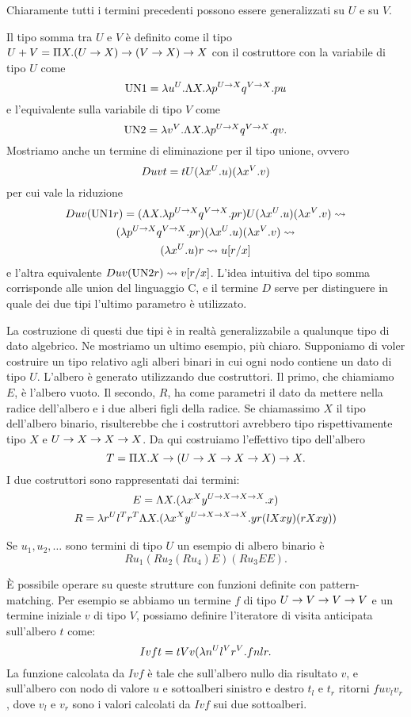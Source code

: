 \documentclass[]{marticle}
\begin{document}
Chiaramente tutti i termini precedenti possono essere generalizzati su $U$ e su
$V$.

Il tipo somma tra $U$ e $V$ \`e definito come il tipo $U+V = \Pi X. (U\rightarrow X)
\rightarrow (V\rightarrow X) \rightarrow X$ con il costruttore con la variabile di tipo $U$ come 
\[
    \text{UN1} = \lambda u^U. \Lambda X. \lambda p^{U\rightarrow X} q^{V\rightarrow X}. pu
\]
e l'equivalente sulla variabile di tipo $V$ come 
\[
    \text{UN2} = \lambda v^V. \Lambda X. \lambda p^{U\rightarrow X} q^{V\rightarrow X}. qv.
\]
Mostriamo anche un termine di eliminazione per il tipo unione, ovvero
\[
    D uvt = tU (\lambda x^U.u)(\lambda x^V.v)
\]
per cui vale la riduzione
\begin{gather*}
    Duv(\text{UN1}r) = (\Lambda X. \lambda p^{U\rightarrow X}q^{V\rightarrow X}. pr) U (\lambda x^U.u)(\lambda
    x^V.v) \rightsquigarrow \\
    (\lambda p^{U\rightarrow X}q^{V\rightarrow X}. pr)(\lambda x^U.u)(\lambda x^V.v) \rightsquigarrow \\
    (\lambda x^U.u) r \rightsquigarrow u[r/x]
\end{gather*}
e l'altra equivalente $Duv(\text{UN2}r) \rightsquigarrow v[r/x]$.
L'idea intuitiva del tipo somma corrisponde alle union del linguaggio C, e il
termine $D$ serve per distinguere in quale dei due tipi l'ultimo parametro \`e
utilizzato.

La costruzione di questi due tipi \`e in realt\`a generalizzabile a qualunque
tipo di dato algebrico. Ne mostriamo un ultimo esempio, pi\`u chiaro. Supponiamo
di voler costruire un tipo relativo agli alberi binari in cui ogni nodo contiene
un dato di tipo $U$. L'albero \`e generato utilizzando due costruttori. Il
primo, che chiamiamo $E$, \`e l'albero vuoto. Il secondo, $R$, ha come parametri
il dato da mettere nella radice dell'albero e i due alberi figli della radice.
Se chiamassimo $X$ il tipo dell'albero binario, risulterebbe che i costruttori
avrebbero tipo rispettivamente tipo $X$ e $U \rightarrow X\rightarrow X \rightarrow X$. Da qui
costruiamo l'effettivo tipo dell'albero
\[
    T = \Pi X. X \rightarrow (U \rightarrow X \rightarrow X \rightarrow X) \rightarrow X.
\]
I due costruttori sono rappresentati dai termini:
\begin{gather*}
    E = \Lambda X. (\lambda x^X y^{U \rightarrow X \rightarrow X \rightarrow X}.x) \\
    R = \lambda r^U l^T r^T \Lambda X. (\lambda x^X y^{U \rightarrow X \rightarrow X \rightarrow X}.yr(lXxy)(rXxy))
\end{gather*}

Se $u_1, u_2,\dots$ sono termini di tipo $U$ un esempio di albero binario \`e 
\[
    Ru_1(Ru_2(Ru_4)E)(Ru_3EE).
\]

\`E possibile operare su queste strutture con funzioni definite con
pattern-matching. Per esempio se abbiamo un termine $f$ di tipo $U\rightarrow V \rightarrow V\rightarrow V$
e un termine iniziale $v$ di tipo $V$, possiamo definire l'iteratore di visita
anticipata sull'albero $t$ come:
\[
    Ivft = tVv(\lambda n^U l^V r^V. f nlr.
\]
La funzione calcolata da $Ivf$ \`e tale che sull'albero nullo dia risultato $v$,
e sull'albero con nodo di valore $u$ e sottoalberi sinistro e destro $t_l$ e
$t_r$ ritorni $f u v_l v_r$, dove $v_l$ e $v_r$ sono i valori calcolati da $Ivf$
sui due sottoalberi.
\end{document}
